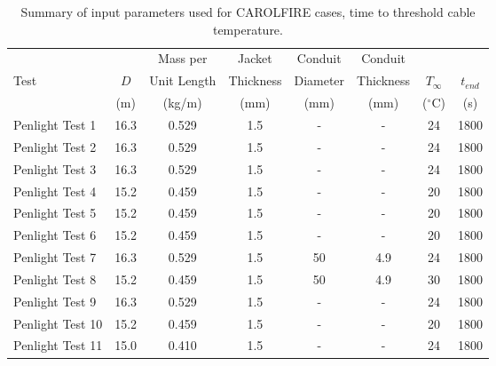 \begin{table}[!h]
\caption{Summary of input parameters used for CAROLFIRE cases, time to threshold cable temperature.}

\begin{center}
\begin{tabular}{|l|c|c|c|c|c|c|c|}
\hline
                  &        &  Mass per     &  Jacket     &  Conduit   &  Conduit    &               &             \\
Test              &  $D$   &  Unit Length  &  Thickness  &  Diameter  &  Thickness  &  $T_\infty$   &  $t_{end}$  \\
                  &  (m)   &  (kg/m)       &  (mm)       &  (mm)      &  (mm)       &  ($^\circ$C)  &  (s)        \\ \hline \hline
Penlight Test 1   &  16.3  &  0.529        &  1.5        &  -         &  -          &  24           &  1800       \\ \hline
Penlight Test 2   &  16.3  &  0.529        &  1.5        &  -         &  -          &  24           &  1800       \\ \hline
Penlight Test 3   &  16.3  &  0.529        &  1.5        &  -         &  -          &  24           &  1800       \\ \hline
Penlight Test 4   &  15.2  &  0.459        &  1.5        &  -         &  -          &  20           &  1800       \\ \hline
Penlight Test 5   &  15.2  &  0.459        &  1.5        &  -         &  -          &  20           &  1800       \\ \hline
Penlight Test 6   &  15.2  &  0.459        &  1.5        &  -         &  -          &  20           &  1800       \\ \hline
Penlight Test 7   &  16.3  &  0.529        &  1.5        &  50        &  4.9        &  24           &  1800       \\ \hline
Penlight Test 8   &  15.2  &  0.459        &  1.5        &  50        &  4.9        &  30           &  1800       \\ \hline
Penlight Test 9   &  16.3  &  0.529        &  1.5        &  -         &  -          &  24           &  1800       \\ \hline
Penlight Test 10  &  15.2  &  0.459        &  1.5        &  -         &  -          &  20           &  1800       \\ \hline
Penlight Test 11  &  15.0  &  0.410        &  1.5        &  -         &  -          &  24           &  1800       \\ \hline

\end{tabular}
\end{center}
\end{table}
